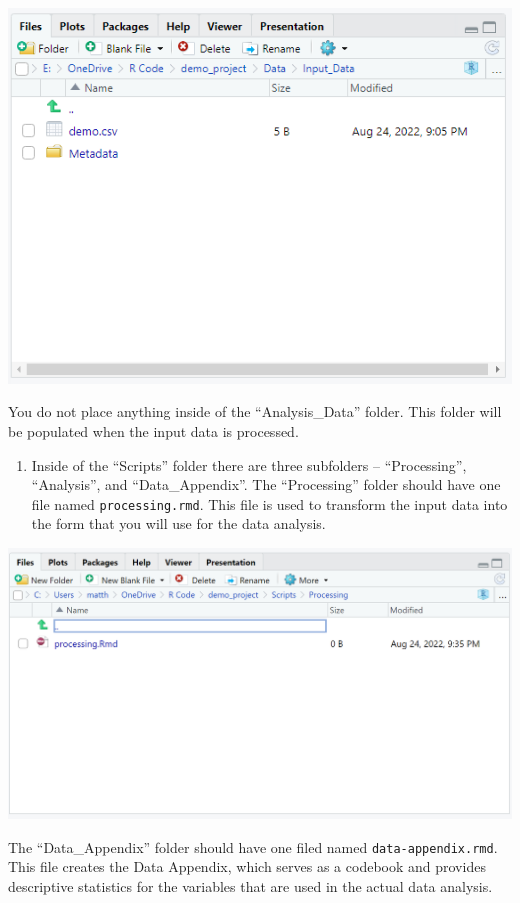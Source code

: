 \documentclass[
]{book}
\providecommand{\tightlist}{%
  \setlength{\itemsep}{0pt}\setlength{\parskip}{0pt}}
\begin{document}
\includegraphics{images/tierinput.png}

You do not place anything inside of the ``Analysis\_Data'' folder. This folder will be populated when the input data is processed.

\begin{enumerate}
\def\labelenumi{\arabic{enumi}.}
\setcounter{enumi}{3}
\tightlist
\item
  Inside of the ``Scripts'' folder there are three subfolders -- ``Processing'', ``Analysis'', and ``Data\_Appendix''. The ``Processing'' folder should have one file named \texttt{processing.rmd}. This file is used to transform the input data into the form that you will use for the data analysis.
\end{enumerate}

\includegraphics{images/tierprocessing.png}

The ``Data\_Appendix'' folder should have one filed named \texttt{data-appendix.rmd}. This file creates the Data Appendix, which serves as a codebook and provides descriptive statistics for the variables that are used in the actual data analysis.
\end{document}
